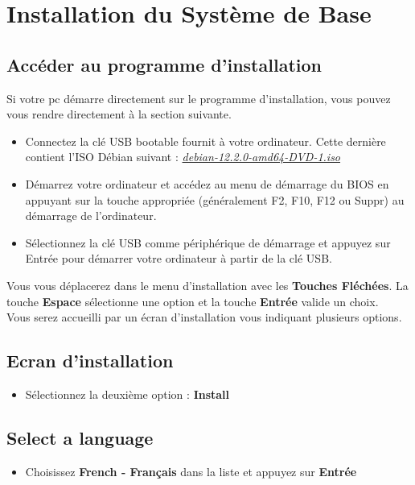 \chapter{Installation du Système de Base}

\section{Accéder au programme d'installation}

Si votre pc démarre directement sur le programme d'installation, vous pouvez vous rendre directement à la section suivante.

\begin{itemize}
\item Connectez la clé USB bootable fournit à votre ordinateur. Cette dernière contient l'ISO Débian suivant : \textit{\href{https://cdimage.debian.org/debian-cd/current/amd64/iso-dvd/debian-12.2.0-amd64-DVD-1.iso}{debian-12.2.0-amd64-DVD-1.iso}}
\item Démarrez votre ordinateur et accédez au menu de démarrage du BIOS en appuyant sur la touche appropriée (généralement F2, F10, F12 ou Suppr) au démarrage de l'ordinateur.
\item Sélectionnez la clé USB comme périphérique de démarrage et appuyez sur Entrée pour démarrer votre ordinateur à partir de la clé USB.\\
\end{itemize}

Vous vous déplacerez dans le menu d'installation avec les \textbf{Touches Fléchées}. La touche \textbf{Espace} sélectionne une option et la touche \textbf{Entrée} valide un choix.\\

Vous serez accueilli par un écran d'installation vous indiquant plusieurs options.

\section{Ecran d'installation}
\begin{itemize}
	\item Sélectionnez la deuxième option : \textbf{Install}
\end{itemize}

\section{Select a language}
\begin{itemize}
	\item Choisissez \textbf{French - Français} dans la liste et appuyez sur \textbf{Entrée}
\end{itemize}

